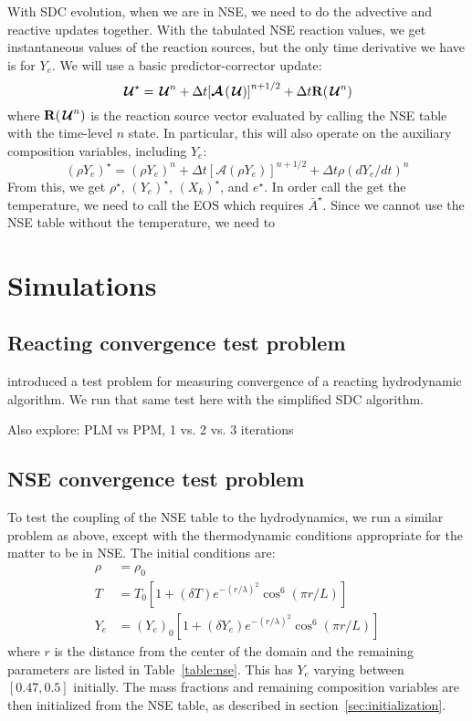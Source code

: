 \documentclass[times,modern]{aastex63}
\newcommand{\Uc}{{\,\bm{\mathcal{U}}}}
\newcommand{\Rb}{{\bf R}}
\newcommand{\Adv}[1]{{\left [\boldsymbol{\mathcal{A}} \left(#1\right)\right]}}
\newcommand{\MarginPar}[1]{\marginpar{\vskip-\baselineskip\raggedright\tiny\sffamily\hrule\smallskip{\color{red}#1}\par\smallskip\hrule}}
\begin{document}
With SDC evolution, when we are in NSE, we need to do the advective
and reactive updates together.  With the tabulated NSE reaction
values, we get instantaneous values of the reaction sources, but the only
time derivative we have is for $Y_e$.  We will
use a basic predictor-corrector update:
\begin{equation}
\Uc^\star = \Uc^n + \Delta t \Adv{\Uc}^{n+1/2} + \Delta t \Rb (\Uc^n)
\end{equation}
where $\Rb(\Uc^n)$ is the reaction source vector evaluated by calling the NSE
table with the time-level $n$ state.
In particular, this will also operate on the auxiliary composition variables,
including $Y_e$:
\begin{equation}
(\rho Y_e)^\star = (\rho Y_e)^n + \Delta t \Adv{\rho Y_e}^{n+1/2} + \Delta t \rho (dY_e/dt)^n
\end{equation}
From this, we get $\rho^\star$, $(Y_e)^\star$, $(X_k)^\star$, and
$e^\star$.  In order call the get the temperature, we need to call the
EOS which requires $\bar{A}^\star$.  Since we cannot use the NSE table
without the temperature, we need to 


\section{Simulations}

\subsection{Reacting convergence test problem}

\cite{castro_sdc} introduced a test problem for measuring convergence
of a reacting hydrodynamic algorithm.  We run that same test here with the
simplified SDC algorithm.

Also explore: PLM vs PPM, 1 vs. 2 vs. 3 iterations

\subsection{NSE convergence test problem}

To test the coupling of the NSE table to the hydrodynamics, we run a
similar problem as above, except with the thermodynamic conditions
appropriate for the matter to be in NSE.  The initial conditions are:
\begin{align}
\rho &= \rho_0 \\
T &= T_0 \left [ 1 + (\delta T) e^{-(r/\lambda)^2} \cos^6(\pi r/L) \right ] \\
Y_e &= (Y_e)_0 \left [ 1 + (\delta Y_e) e^{-(r/\lambda)^2} \cos^6(\pi r/L) \right ] 
\end{align}
where $r$ is the distance from the center of the domain and the
remaining parameters are listed in Table~\ref{table:nse}.  This has
$Y_e$ varying between $[0.47, 0.5]$ initially\MarginPar{check}.  The mass fractions
and remaining composition variables are then initialized from the NSE table, as described in section~\ref{sec:initialization}.
\end{document}
